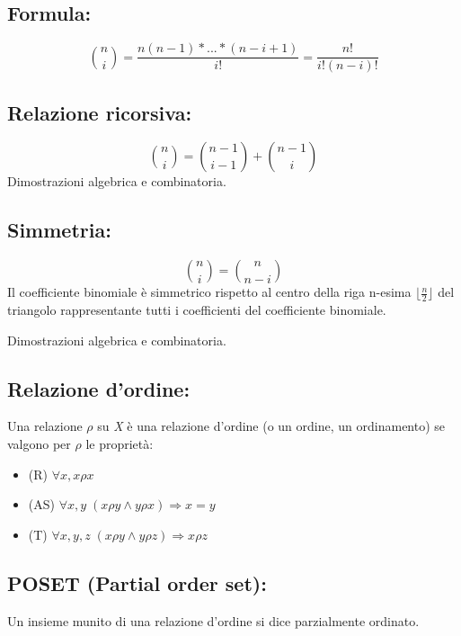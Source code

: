 \subsection{Formula:} \[\binom{n}{i}=\frac{n(n-1)\ast ... \ast (n-i+1)}{i!} = \frac{n!}{i!(n-i)!}\]

\subsection{Relazione ricorsiva:}\[\binom{n}{i}=\binom{n-1}{i-1}+\binom{n-1}{i}\]
Dimostrazioni algebrica e combinatoria.

\subsection{Simmetria:}\[\binom{n}{i}=\binom{n}{n-i}\]
Il coefficiente binomiale è simmetrico rispetto al centro della riga n-esima \(\lfloor\frac{n}{2}\rfloor\) del triangolo rappresentante tutti i coefficienti del coefficiente binomiale.

Dimostrazioni algebrica e combinatoria.

\subsection{Relazione d'ordine:}
Una relazione \(\rho\) su \textit{X} è una relazione d'ordine (o un ordine, un ordinamento) se valgono per \(\rho\) le proprietà:
\begin{itemize}
    \item (R) \(\forall x, x\rho x\)
    \item (AS) \(\forall x,y\; (x\rho y\land y\rho x)\Rightarrow x=y\)
    \item (T) \(\forall x,y,z\; (x\rho y\land y\rho z)\Rightarrow x\rho z\)
\end{itemize}

\subsection{POSET (Partial order set):}
Un insieme munito di una relazione d'ordine si dice parzialmente ordinato.
